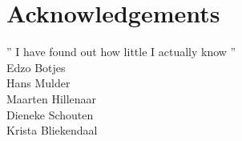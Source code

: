 {}
\chapter*{Acknowledgements}
\bigskip

'' I have found out how little I actually know ''\\

\noindent Edzo Botjes\\
Hans Mulder\\
Maarten Hillenaar\\
Dieneke Schouten\\
Krista Bliekendaal\\
